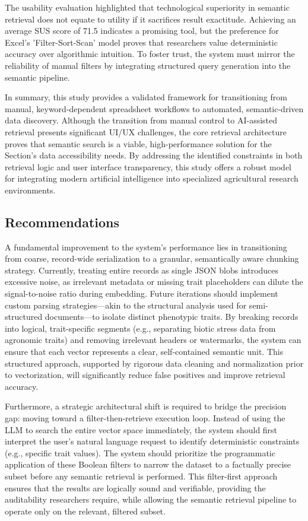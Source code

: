 \documentclass[journal]{./IEEE/IEEEtran}
\begin{document}
The usability evaluation highlighted that technological superiority in semantic retrieval does not equate to utility if it sacrifices result exactitude. Achieving an average SUS score of 71.5 indicates a promising tool, but the preference for Excel's 'Filter-Sort-Scan' model proves that researchers value deterministic accuracy over algorithmic intuition. To foster trust, the system must mirror the reliability of manual filters by integrating structured query generation into the semantic pipeline.

In summary, this study provides a validated framework for transitioning from manual, keyword-dependent spreadsheet workflows to automated, semantic-driven data discovery. Although the transition from manual control to AI-assisted retrieval presents significant UI/UX challenges, the core retrieval architecture proves that semantic search is a viable, high-performance solution for the Section’s data accessibility needs. By addressing the identified constraints in both retrieval logic and user interface transparency, this study offers a robust model for integrating modern artificial intelligence into specialized agricultural research environments.
    
\subsection{Recommendations}
A fundamental improvement to the system’s performance lies in transitioning from coarse, record-wide serialization to a granular, semantically aware chunking strategy. Currently, treating entire records as single JSON blobs introduces excessive noise, as irrelevant metadata or missing trait placeholders can dilute the signal-to-noise ratio during embedding. Future iterations should implement custom parsing strategies—akin to the structural analysis used for semi-structured documents—to isolate distinct phenotypic traits. By breaking records into logical, trait-specific segments (e.g., separating biotic stress data from agronomic traits) and removing irrelevant headers or watermarks, the system can ensure that each vector represents a clear, self-contained semantic unit. This structured approach, supported by rigorous data cleaning and normalization prior to vectorization, will significantly reduce false positives and improve retrieval accuracy.

Furthermore, a strategic architectural shift is required to bridge the precision gap: moving toward a filter-then-retrieve execution loop. Instead of using the LLM to search the entire vector space immediately, the system should first interpret the user's natural language request to identify deterministic constraints (e.g., specific trait values). The system should prioritize the programmatic application of these Boolean filters to narrow the dataset to a factually precise subset before any semantic retrieval is performed. This filter-first approach ensures that the results are logically sound and verifiable, providing the auditability researchers require, while allowing the semantic retrieval pipeline to operate only on the relevant, filtered subset.
\end{document}
